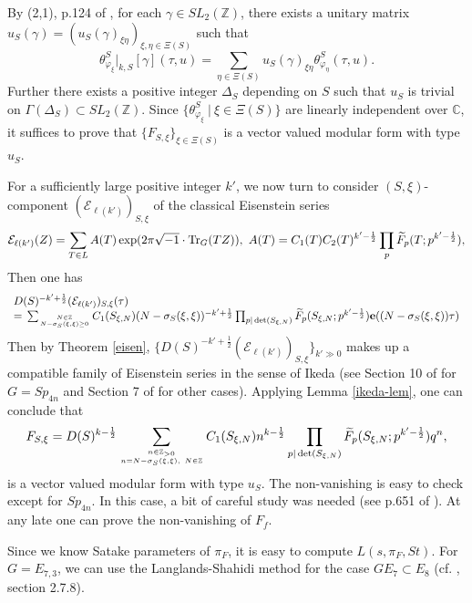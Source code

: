 \documentclass[11pt]{amsart}
\numberwithin{equation}{section}
\theoremstyle{definition}
\begin{document}
By (2,1), p.124 of \cite{takase}, for each $\gamma\in SL_2({\mathbb{Z}})$, there exists a unitary matrix $u_S(\gamma)=
(u_S(\gamma)_{\xi \eta})_{\xi,\eta\in \Xi(S)}$ such that
\begin{equation*}\label{inv2}
\theta^S_{\varphi_\xi}|_{k,S}[\gamma](\tau,u)=\sum_{\eta\in \Xi(S)}u_S(\gamma)_{\xi\eta}\theta^S_{\varphi_\eta}(\tau,u).
\end{equation*}
Further there exists a positive integer $\Delta_S$ depending on $S$ such that $u_S$ is trivial on $\Gamma(\Delta_S)\subset SL_2({\mathbb{Z}})$.
Since $\{ \theta^S_{\varphi_\xi}\ |\  \xi\in \Xi(S) \}$ are linearly independent over ${\mathbb{C}}$,
it suffices to prove that $\{F_{S,\xi}\}_{\xi\in \Xi(S)}$ is a vector
valued modular form with type $u_S$.

For a sufficiently large positive integer $k'$,
we now turn to consider $(S,\xi)$-component $(\mathcal{E}_{\ell(k')})_{S,\xi}$ of the classical
Eisenstein series
$$ \mathcal{E}_{\ell(k')}(Z)=\sum_{T\in L}A(T)\exp(2\pi\sqrt{-1}\cdot {{\rm Tr}}_G(TZ)),\
A(T)=C_1(T)C_2(T)^{k'-\frac{1}{2}}\prod_{p}\widetilde{F}_{p}(T;p^{k'-\frac{1}{2}}),$$
Then one has
$$
\begin{array}{l}
D(S)^{-k'+\frac{1}{2}}(\mathcal{E}_{\ell(k')})_{S,\xi}(\tau)\\
=
{\displaystyle}\sum_{N\in {\mathbb{Z}} \atop N-\sigma_S(\xi,\xi)\ge 0}C_1(S_{\xi,N})(N-\sigma_S(\xi,\xi))^{-k'+\frac{1}{2}}
\prod_{p|\det(S_{\xi,N})}\widetilde{F}_{p}(S_{\xi,N};p^{k'-\frac{1}{2}})\bold{e}((N-\sigma_S(\xi,\xi))\tau)\\
\end{array}
$$
Then by Theorem \ref{eisen},
$\{D(S)^{-k'+\frac{1}{2}}(\mathcal{E}_{\ell(k')})_{S,\xi}\}_{k'\gg0}$ makes up a compatible family of Eisenstein series
in the sense of Ikeda (see Section 10 of \cite{Ik1} for $G=Sp_{4n}$ and Section 7 of \cite{Ik2} for other cases).
Applying Lemma \ref{ikeda-lem}, one can conclude that
$$F_{S,\xi}=D(S)^{k-\frac{1}{2}}{\displaystyle}\sum_{n\in{\mathbb{Z}}_{>0}\atop
n=N-\sigma_S(\xi,\xi),\ N\in {\mathbb{Z}}}C_1(S_{\xi,N}) n^{k-\frac{1}{2}} \prod_{p|\det(S_{\xi,N})}\widetilde{F}_{p}(S_{\xi,N};p^{k'-\frac{1}{2}}) q^n,
$$
is a vector valued modular form with type $u_S$. The non-vanishing is easy to check except for $Sp_{4n}$.
In this case, a bit of careful study was needed (see p.651 of \cite{Ik1}). At any late one can prove the non-vanishing of $F_f$.

Since we know Satake parameters of $\pi_F$, it is easy to compute $L(s,\pi_F,St)$.
For $G=E_{7,3}$, we can use the Langlands-Shahidi method for the case $GE_7\subset E_8$ (cf. \cite{kim1}, section 2.7.8).
\end{document}
